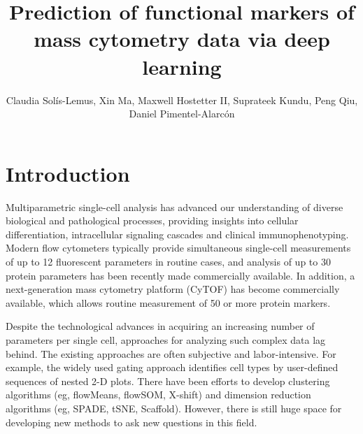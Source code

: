 \documentclass[graybox]{svmult}
\begin{document}
\title*{Prediction of functional markers of mass cytometry data via
  deep learning}
\author{Claudia Sol\'is-Lemus, Xin Ma, Maxwell Hostetter II, Suprateek
  Kundu, Peng Qiu, Daniel Pimentel-Alarc\'on}
%
%
\maketitle


\section{Introduction}

Multiparametric single-cell analysis has advanced our understanding of
diverse biological and pathological processes, providing insights into
cellular differentiation, intracellular signaling cascades and
clinical immunophenotyping. Modern flow cytometers typically provide
simultaneous single-cell measurements of up to 12 fluorescent
parameters in routine cases, and analysis of up to 30 protein
parameters has been recently made commercially available. In addition,
a next-generation mass cytometry platform (CyTOF) has become
commercially available, which allows routine measurement of 50 or more
protein markers.

Despite the technological advances in acquiring an
increasing number of parameters per single cell, approaches for
analyzing such complex data lag behind. The existing approaches are
often subjective and labor-intensive. For example, the widely used
gating approach identifies cell types by user-defined sequences of
nested 2-D plots. There have been efforts to develop clustering
algorithms (eg, flowMeans, flowSOM, X-shift) and dimension reduction
algorithms (eg, SPADE, tSNE, Scaffold). However, there is still huge
space for developing new methods to ask new questions in this field.
\end{document}
